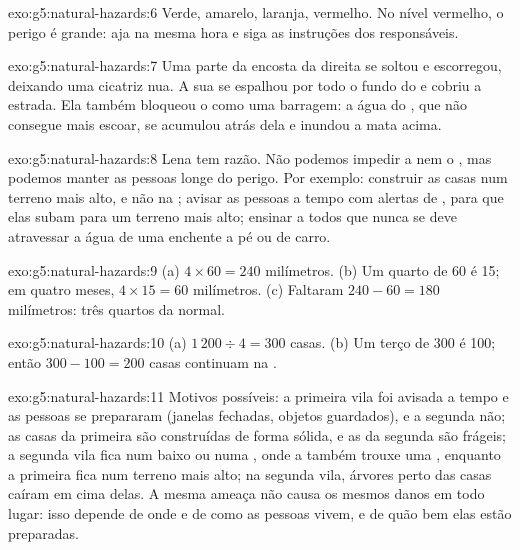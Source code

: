 \begin{solution}{exo:g5:natural-hazards:6}
Verde, amarelo, laranja, vermelho. No nível vermelho, o perigo é grande:
aja na mesma hora e siga as instruções dos responsáveis.
\end{solution}

\begin{solution}{exo:g5:natural-hazards:7}
Uma parte da encosta da direita se soltou e escorregou, deixando uma
cicatriz nua. A sua  se espalhou por todo o fundo do  e cobriu a
estrada. Ela também bloqueou o  como uma barragem: a água do , que
não consegue mais escoar, se acumulou atrás dela e inundou a mata 
acima.
\end{solution}

\begin{solution}{exo:g5:natural-hazards:8}
Lena tem razão. Não podemos impedir a  nem o , mas podemos manter
as pessoas longe do perigo. Por exemplo: construir as casas num terreno
mais alto, e não na ; avisar as pessoas a tempo com
alertas de , para que elas subam para um terreno mais alto;
ensinar a todos que nunca se deve atravessar a água de uma enchente a pé
ou de carro.
\end{solution}

\begin{solution}{exo:g5:natural-hazards:9}
(a) $4 \times 60 = 240$ milímetros. (b) Um quarto de 60 é 15; em quatro
meses, $4 \times 15 = 60$ milímetros. (c) Faltaram $240 - 60 = 180$
milímetros: três quartos da  normal.
\end{solution}

\begin{solution}{exo:g5:natural-hazards:10}
(a) $1\,200 \div 4 = 300$ casas. (b) Um terço de 300 é 100; então
$300 - 100 = 200$ casas continuam na .
\end{solution}

\begin{solution}{exo:g5:natural-hazards:11}
Motivos possíveis: a primeira vila foi avisada a tempo e as pessoas se
prepararam (janelas fechadas, objetos guardados), e a segunda não; as
casas da primeira são construídas de forma sólida, e as da segunda são
frágeis; a segunda vila fica num  baixo ou numa , onde a  também trouxe uma , enquanto a
primeira fica num terreno mais alto; na segunda vila, árvores perto das
casas caíram em cima delas. A mesma ameaça não causa os mesmos danos em
todo lugar: isso depende de onde e de como as pessoas vivem, e de quão bem
elas estão preparadas.
\end{solution}
